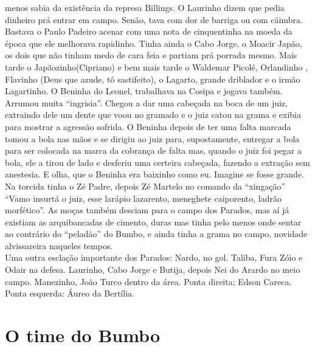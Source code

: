 \documentclass[12pt,brazil,]{book}
\begin{document}
menos sabia da existência da represa Billings. O Laurinho dizem que
pedia dinheiro prá entrar em campo. Senão, tava com dor de barriga ou
com câimbra. Bastava o Paulo Padeiro acenar com uma nota de cinquentinha
na moeda da época que ele melhorava rapidinho. Tinha ainda o Cabo Jorge,
o Moacir Japão, os dois que não tinham medo de cara feia e partiam prá
porrada mesmo. Mais tarde o Japãozinho(Cipriano) e bem mais tarde o
Waldemar Picolé, Orlandinho , Flavinho (Deus que azude, tô sastifeito),
o Lagarto, grande driblador e o irmão Lagartinho. O Beninha do Leonel,
trabalhava na Cosipa e jogava também. Arrumou muita ``ingrisia''. Chegou
a dar uma cabeçada na boca de um juiz, extraindo dele um dente que voou
no gramado e o juiz catou na grama e exibia para mostrar a agressão
sofrida. O Beninha depois de ter uma falta marcada tomou a bola nas mãos
e se dirigiu ao juiz para, supostamente, entregar a bola para ser
colocada na marca da cobrança de falta mas, quando o juiz foi pegar a
bola, ele a tirou de lado e desferiu uma certeira cabeçada, fazendo a
extração sem anestesia. E olha, que o Beninha era baixinho como eu.
Imagine se fosse grande.\\
Na torcida tinha o Zé Padre, depois Zé Martelo no comando da
``xingação'' ``Vamo insurtá o juiz, esse larápio lazarento, meneghete
caiporento, ladrão morfético''. As moças também desciam para o campo dos
Parados, mas aí já existiam as arquibancadas de cimento, duras mas tinha
pelo menos onde sentar ao contrário do ``peladão'' do Bumbo, e ainda
tinha a grama no campo, novidade alvissareira naqueles tempos.\\
Uma outra esclação importante dos Parados: Nardo, no gol. Taliba, Fura
Zóio e Odair na defesa. Laurinho, Cabo Jorge e Butija, depois Nei do
Arardo no meio campo. Manezinho, João Turco dentro da área. Ponta
direita; Edson Careca. Ponta esquerda: Áureo da Bertília.

\section{O time do Bumbo}\label{o-time-do-bumbo}
\end{document}
